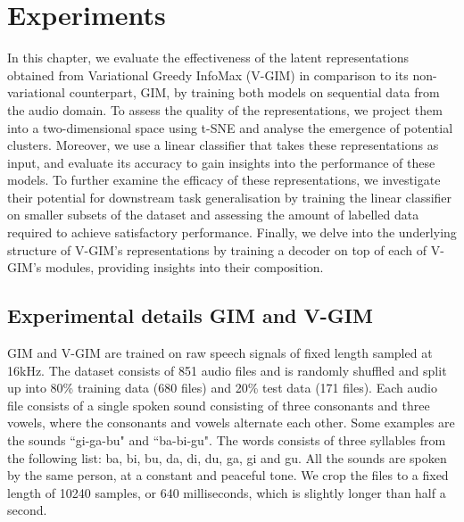 \chapter{Experiments}

In this chapter, we evaluate the effectiveness of the latent representations obtained from Variational Greedy InfoMax (V-GIM) in comparison to its non-variational counterpart, GIM, by training both models on sequential data from the audio domain. To assess the quality of the representations, we project them into a two-dimensional space using t-SNE and analyse the emergence of potential clusters. Moreover, we use a linear classifier that takes these representations as input, and evaluate its accuracy to gain insights into the performance of these models. To further examine the efficacy of these representations, we investigate their potential for downstream task generalisation by training the linear classifier on smaller subsets of the dataset and assessing the amount of labelled data required to achieve satisfactory performance. Finally, we delve into the underlying structure of V-GIM's representations by training a decoder on top of each of V-GIM's modules, providing insights into their composition.


%	

	







\section{Experimental details GIM and V-GIM} \label{cha:experim_details_vgim}
		GIM and V-GIM are trained on raw speech signals of fixed length sampled at 16kHz. The dataset consists of 851  audio files and is randomly shuffled and split up into 80\% training data (680 files) and 20\% test data (171 files). Each audio file consists of a single spoken sound consisting of three consonants and three vowels, where the consonants and vowels alternate each other. Some examples are the sounds ``gi-ga-bu" and ``ba-bi-gu". The words consists of three syllables from the following list: ba, bi, bu, da, di, du, ga, gi and gu. All the sounds are spoken by the same person, at a constant and peaceful tone. We crop the files to a fixed length of 10240 samples, or 640 milliseconds, which is slightly longer than half a second.
		
